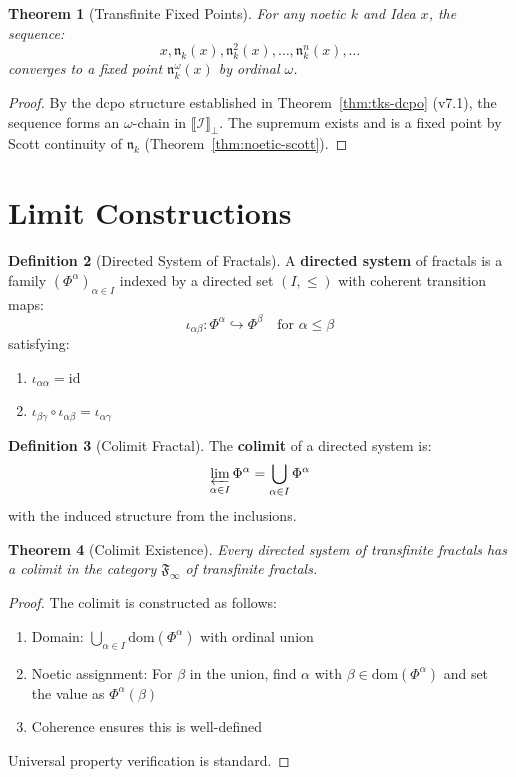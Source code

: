 \documentclass[11pt,twoside,openright]{book}
\theoremstyle{definition}
\newtheorem{definition}{Definition}[chapter]
\theoremstyle{plain}
\newtheorem{theorem}[definition]{Theorem}
\theoremstyle{remark}
\newcommand{\sem}[1]{\llbracket #1 \rrbracket}
\newcommand{\Ideas}{\mathcal{I}}
\newcommand{\FracSet}{\mathfrak{F}}
\newcommand{\TransFrac}[1]{\Phi^{#1}}        %
\newcommand{\colfrac}{\varprojlim}           %
\begin{document}
\begin{theorem}[Transfinite Fixed Points]
\label{thm:transfinite-fixed}
For any noetic $k$ and Idea $x$, the sequence:
\[
x, \mathfrak{n}_k(x), \mathfrak{n}_k^2(x), \ldots, \mathfrak{n}_k^n(x), \ldots
\]
converges to a fixed point $\mathfrak{n}_k^\omega(x)$ by ordinal $\omega$.
\end{theorem}

\begin{proof}
By the dcpo structure established in Theorem~\ref{thm:tks-dcpo} (v7.1), the sequence forms an $\omega$-chain in $\sem{\Ideas}_\bot$. The supremum exists and is a fixed point by Scott continuity of $\mathfrak{n}_k$ (Theorem~\ref{thm:noetic-scott}).
\end{proof}

\section{Limit Constructions}

\begin{definition}[Directed System of Fractals]
\label{def:directed-system}
A \textbf{directed system} of fractals is a family $(\TransFrac{\alpha})_{\alpha \in I}$ indexed by a directed set $(I, \leq)$ with coherent transition maps:
\[
\iota_{\alpha\beta} : \TransFrac{\alpha} \hookrightarrow \TransFrac{\beta} \quad \text{for } \alpha \leq \beta
\]
satisfying:
\begin{enumerate}
  \item $\iota_{\alpha\alpha} = \mathrm{id}$
  \item $\iota_{\beta\gamma} \circ \iota_{\alpha\beta} = \iota_{\alpha\gamma}$
\end{enumerate}
\end{definition}

\begin{definition}[Colimit Fractal]
\label{def:colimit-fractal}
The \textbf{colimit} of a directed system is:
\[
\colfrac_{\alpha \in I} \TransFrac{\alpha} = \bigcup_{\alpha \in I} \TransFrac{\alpha}
\]
with the induced structure from the inclusions.
\end{definition}

\begin{theorem}[Colimit Existence]
\label{thm:colimit-existence}
Every directed system of transfinite fractals has a colimit in the category $\FracSet_\infty$ of transfinite fractals.
\end{theorem}

\begin{proof}
The colimit is constructed as follows:
\begin{enumerate}
  \item Domain: $\bigcup_{\alpha \in I} \mathrm{dom}(\TransFrac{\alpha})$ with ordinal union
  \item Noetic assignment: For $\beta$ in the union, find $\alpha$ with $\beta \in \mathrm{dom}(\TransFrac{\alpha})$ and set the value as $\TransFrac{\alpha}(\beta)$
  \item Coherence ensures this is well-defined
\end{enumerate}
Universal property verification is standard.
\end{proof}
\end{document}
